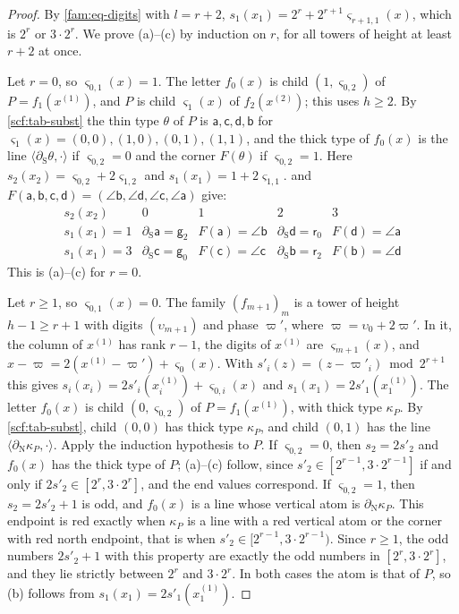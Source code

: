 \begin{proof}
By \eqref{fam:eq-digits} with $l=r+2$, $s_1(x_1)=2^r+2^{r+1}\varsigma_{r+1,1}(x)$, which is $2^r$ or $3\cdot2^r$. We prove (a)--(c) by induction on $r$, for all towers of height at least $r+2$ at once.

Let $r=0$, so $\varsigma_{0,1}(x)=1$. The letter $f_0(x)$ is child $(1,\varsigma_{0,2})$ of $P=f_1(x^{(1)})$, and $P$ is child $\varsigma_1(x)$ of $f_2(x^{(2)})$; this uses $h\ge2$. By \cref{scf:tab-subst} the thin type $\theta$ of $P$ is $\mathsf a,\mathsf c,\mathsf d,\mathsf b$ for $\varsigma_1(x)=(0,0),(1,0),(0,1),(1,1)$, and the thick type of $f_0(x)$ is the line $\langle\partial_{\mathrm S}\theta,\cdot\rangle$ if $\varsigma_{0,2}=0$ and the corner $F(\theta)$ if $\varsigma_{0,2}=1$. Here $s_2(x_2)=\varsigma_{0,2}+2\varsigma_{1,2}$ and $s_1(x_1)=1+2\varsigma_{1,1}$.  and $F(\mathsf a,\mathsf b,\mathsf c,\mathsf d)=(\angle\mathsf b,\angle\mathsf d,\angle\mathsf c,\angle\mathsf a)$ give:
\[
\begin{array}{c|cccc}
s_2(x_2) & 0 & 1 & 2 & 3\\\hline
s_1(x_1)=1 & \partial_{\mathrm S}\mathsf a=\mathsf g_2 & F(\mathsf a)=\angle\mathsf b & \partial_{\mathrm S}\mathsf d=\mathsf r_0 & F(\mathsf d)=\angle\mathsf a\\
s_1(x_1)=3 & \partial_{\mathrm S}\mathsf c=\mathsf g_0 & F(\mathsf c)=\angle\mathsf c & \partial_{\mathrm S}\mathsf b=\mathsf r_2 & F(\mathsf b)=\angle\mathsf d
\end{array}
\]
This is (a)--(c) for $r=0$.

Let $r\ge1$, so $\varsigma_{0,1}(x)=0$. The family $(f_{m+1})_{m}$ is a tower of height $h-1\ge r+1$ with digits $(\upsilon_{m+1})$ and phase $\varpi'$, where $\varpi=\upsilon_0+2\varpi'$. In it, the column of $x^{(1)}$ has rank $r-1$, the digits of $x^{(1)}$ are $\varsigma_{m+1}(x)$, and $x-\varpi=2(x^{(1)}-\varpi')+\varsigma_0(x)$. With $s'_i(z)=(z-\varpi'_i)\bmod2^{r+1}$ this gives $s_i(x_i)=2s'_i(x^{(1)}_i)+\varsigma_{0,i}(x)$ and $s_1(x_1)=2s'_1(x^{(1)}_1)$. The letter $f_0(x)$ is child $(0,\varsigma_{0,2})$ of $P=f_1(x^{(1)})$, with thick type $\kappa_P$. By \cref{scf:tab-subst}, child $(0,0)$ has thick type $\kappa_P$, and child $(0,1)$ has the line $\langle\partial_{\mathrm N}\kappa_P,\cdot\rangle$. Apply the induction hypothesis to $P$. If $\varsigma_{0,2}=0$, then $s_2=2s'_2$ and $f_0(x)$ has the thick type of $P$; (a)--(c) follow, since $s'_2\in[2^{r-1},3\cdot2^{r-1}]$ if and only if $2s'_2\in[2^r,3\cdot2^r]$, and the end values correspond. If $\varsigma_{0,2}=1$, then $s_2=2s'_2+1$ is odd, and $f_0(x)$ is a line whose vertical atom is $\partial_{\mathrm N}\kappa_P$. This endpoint is red exactly when $\kappa_P$ is a line with a red vertical atom or the corner with red north endpoint, that is when $s'_2\in[2^{r-1},3\cdot2^{r-1})$. Since $r\ge1$, the odd numbers $2s'_2+1$ with this property are exactly the odd numbers in $[2^r,3\cdot2^r]$, and they lie strictly between $2^r$ and $3\cdot2^r$. In both cases the atom is that of $P$, so (b) follows from $s_1(x_1)=2s'_1(x^{(1)}_1)$.


\end{proof}
